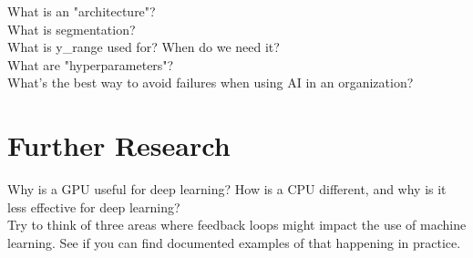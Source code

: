 \documentclass[12pt,a4paper]{article}
\begin{document}
What is an "architecture"? \\

What is segmentation? \\

What is y\_range used for? When do we need it? \\

What are "hyperparameters"? \\

What's the best way to avoid failures when using AI in an organization?

\section*{Further Research}

Why is a GPU useful for deep learning? How is a CPU different, and why is it less effective for deep learning? \\

Try to think of three areas where feedback loops might impact the use of machine learning. See if you can find documented examples of that happening in practice.
\end{document}
